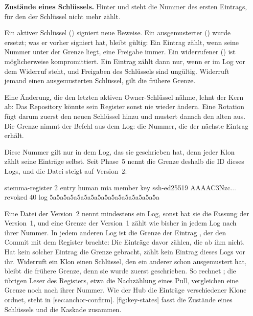 {\bf Zustände eines Schlüssels.}
Hinter  und  steht die Nummer des ersten Eintrags,
für den der Schlüssel nicht mehr zählt.

Ein aktiver Schlüssel () signiert neue Beweise.
Ein ausgemusterter () wurde ersetzt; was er vorher signiert hat, bleibt gültig:
Ein Eintrag zählt, wenn seine Nummer unter der Grenze liegt, eine Freigabe immer.
Ein widerrufener () ist möglicherweise kompromittiert.
Ein Eintrag zählt dann nur, wenn er im Log vor dem Widerruf steht,
und Freigaben des Schlüssels sind ungültig.
Widerruft jemand einen ausgemusterten Schlüssel, gilt die frühere Grenze.

Eine Änderung, die den letzten aktiven Owner-Schlüssel nähme, lehnt der Kern ab:
Das Repository könnte sein Register sonst nie wieder ändern.
Eine Rotation fügt darum zuerst den neuen Schlüssel hinzu und mustert danach den alten aus.
Die Grenze nimmt der Befehl  aus dem Log:
die Nummer, die der nächste Eintrag erhält.

Diese Nummer gilt nur in dem Log, das sie geschrieben hat, denn jeder Klon zählt seine Einträge
selbst.
Seit Phase~5 nennt die Grenze deshalb die ID dieses Logs, und die Datei steigt auf Version~2:

\starttyping
stemma-register 2
entry human mia member
key ssh-ed25519 AAAAC3Nzc... revoked 40 log 5a5a5a5a5a5a5a5a5a5a5a5a5a5a5a5a
\stoptyping

Eine Datei der Version~2 nennt mindestens ein Log, sonst hat sie die Fassung der Version~1, und
eine Grenze der Version~1 zählt wie bisher in jedem Log nach ihrer Nummer.
In jedem anderen Log ist die Grenze der Eintrag , der den Commit mit dem Register
brachte: Die Einträge davor zählen, die ab ihm nicht.
Hat kein solcher Eintrag die Grenze gebracht, zählt kein Eintrag dieses Logs vor ihr.
Widerruft ein Klon einen Schlüssel, den ein anderer schon ausgemustert hat, bleibt die frühere
Grenze, denn sie wurde zuerst geschrieben.
So rechnet ; die übrigen Leser des Registers, etwa die Nachzählung eines Pull,
vergleichen eine Grenze noch nach ihrer Nummer.
Wie der Hub die Einträge verschiedener Klone ordnet, steht in [sec:anchor-confirm].
[fig:key-states] fasst die Zustände eines Schlüssels und die Kaskade zusammen.

\startplacefigure[title={Zustände eines Schlüssels im Akteursregister},
    reference=fig:key-states,location=here]
\stopplacefigure


